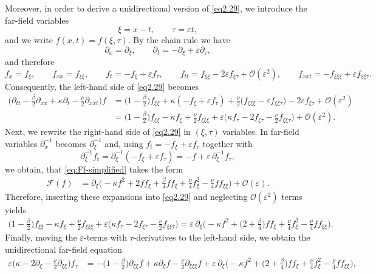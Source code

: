 \documentclass[reqno]{amsart}
\theoremstyle{definition}
\numberwithin{equation}{section}
\numberwithin{theorem}{section}
\numberwithin{definition}{section}
\begin{document}
Moreover, in order to derive a unidirectional version of \eqref{eq2.29}, we introduce the far-field variables
\[
\xi=x-t,\qquad \tau=\varepsilon t,
\]
and we write $f(x,t)=f(\xi,\tau)$. By the chain rule we have
\[
\partial_x=\partial_\xi,\qquad \partial_t=-\partial_\xi+\varepsilon\partial_\tau,
\]
and therefore
\[
f_x=f_\xi,\qquad f_{xx}=f_{\xi\xi},\qquad
f_t=-f_\xi+\varepsilon f_\tau,\qquad
f_{tt}=f_{\xi\xi}-2\varepsilon f_{\xi\tau}+\mathcal O(\varepsilon^2),
\qquad
f_{xxt}=-f_{\xi\xi\xi}+\varepsilon f_{\xi\xi\tau}.
\]
Consequently, the left-hand side of \eqref{eq2.29} becomes
\begin{align*}
	\Big(\partial_{tt}-\frac{\beta}{2}\partial_{xx}+\kappa\partial_t-\frac{\nu}{2}\partial_{xxt}\Big)f &=
	\Big(1-\frac{\beta}{2}\Big)f_{\xi\xi}+\kappa(-f_\xi+\varepsilon f_\tau)
	+\frac{\nu}{2}\Big(f_{\xi\xi\xi}-\varepsilon f_{\xi\xi\tau}\Big)
	-2\varepsilon f_{\xi\tau}
	+\mathcal O(\varepsilon^2)\\
	&=
	\Big(1-\frac{\beta}{2}\Big)f_{\xi\xi}-\kappa f_\xi+\frac{\nu}{2}f_{\xi\xi\xi}
	+\varepsilon\Big(\kappa f_\tau-2f_{\xi\tau}-\frac{\nu}{2}f_{\xi\xi\tau}\Big)
	+\mathcal O(\varepsilon^2).
\end{align*}
Next, we rewrite the right-hand side of \eqref{eq2.29} in $(\xi,\tau)$ variables. In far-field variables $\partial_x^{-1}$ becomes
$\partial_\xi^{-1}$ and, using $f_t=-f_\xi+\varepsilon f_\tau$ together with
\[
\partial_\xi^{-1}f_t=\partial_\xi^{-1}(-f_\xi+\varepsilon f_\tau)=-f+\varepsilon\,\partial_\xi^{-1}f_\tau,
\]
we obtain, that \eqref{eq:Ff-simplified} takes the form
\begin{align*}
	\mathcal F(f)
	&=\partial_\xi\bigg(
	-\kappa f^2
	+2 f f_\xi
	+\frac{\beta}{4}f f_\xi
	+\frac{\nu}{4}f_\xi^2
	-\frac{\nu}{4}f f_{\xi\xi}
	\bigg)
	+\mathcal O(\varepsilon).
\end{align*}
Therefore, inserting these expansions into \eqref{eq2.29} and neglecting $\mathcal O(\varepsilon^2)$ terms yields
\begin{align*}
	\Big(1-\frac{\beta}{2}\Big)f_{\xi\xi}-\kappa f_\xi+\frac{\nu}{2}f_{\xi\xi\xi}
	+\varepsilon\Big(\kappa f_\tau-2f_{\xi\tau}-\frac{\nu}{2}f_{\xi\xi\tau}\Big)
	=
	\varepsilon\,\partial_\xi\Big(
	-\kappa f^2+ \Big(2+\frac{\beta}{4}\Big) f f_\xi
	+\frac{\nu}{4}f_\xi^2
	-\frac{\nu}{4}f f_{\xi\xi}
	\Big).
\end{align*}
Finally, moving the $\varepsilon$-terms with $\tau$-derivatives to the left-hand side, we obtain the unidirectional
far-field equation
\begin{align*}
	\varepsilon\Big(\kappa-2\partial_\xi-\frac{\nu}{2}\partial_{\xi\xi}\Big)f_\tau
	&=
	-\Big(1-\frac{\beta}{2}\Big)\partial_{\xi\xi}f+\kappa\partial_\xi f-\frac{\nu}{2}\partial_{\xi\xi\xi}f
	+\varepsilon\,\partial_\xi\Big(
	-\kappa f^2+ \Big(2+\frac{\beta}{4}\Big) f f_\xi
	+\frac{\nu}{4}f_\xi^2
	-\frac{\nu}{4}f f_{\xi\xi}
	\Big),
\end{align*}
\end{document}
